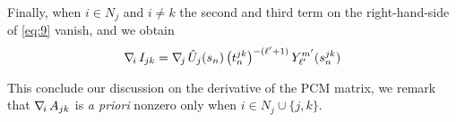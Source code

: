 Finally, when $i \in N_j$ and $i \not=k$ the second and third term on the right-hand-side of \eqref{eq:9} vanish, and we obtain 
\[
\nabla_{\!i}\, I_{jk} = \nabla_{\!j}\, \hat{U}_j(s_n)  \,  \big( t_n^{jk}\big)^{-(\ell'+1)} \, Y_{\ell'}^{m'} (s_n^{jk})
\]

This conclude our discussion on the derivative of the PCM matrix, we remark that $\nabla_{\!i}\, A_{jk}$ is \emph{a priori} nonzero only when $i \in N_j \cup \{ j,k\}$.


%
